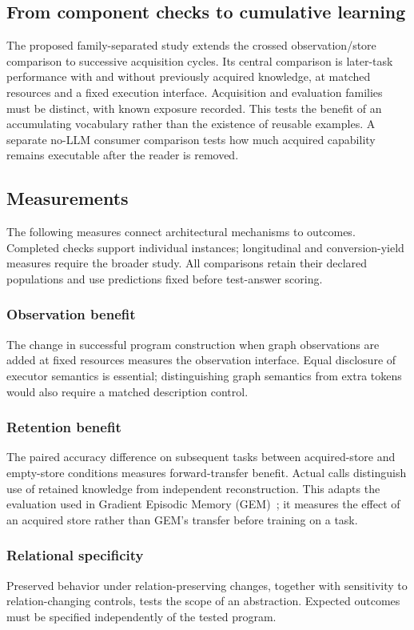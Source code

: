 \documentclass[11pt]{article}
\begin{document}
\subsection{From component checks to cumulative learning}\label{design:four-condition}
The proposed family-separated study extends the crossed observation/store comparison to successive acquisition cycles. Its central comparison is later-task performance with and without previously acquired knowledge, at matched resources and a fixed execution interface. Acquisition and evaluation families must be distinct, with known exposure recorded. This tests the benefit of an accumulating vocabulary rather than the existence of reusable examples. A separate no-LLM consumer comparison tests how much acquired capability remains executable after the reader is removed.

\subsection{Measurements}
The following measures connect architectural mechanisms to outcomes. Completed checks support individual instances; longitudinal and conversion-yield measures require the broader study. All comparisons retain their declared populations and use predictions fixed before test-answer scoring.

\subsubsection{Observation benefit}\label{measure:obs}
The change in successful program construction when graph observations are added at fixed resources measures the observation interface. Equal disclosure of executor semantics is essential; distinguishing graph semantics from extra tokens would also require a matched description control.

\subsubsection{Retention benefit}\label{measure:ret}
The paired accuracy difference on subsequent tasks between acquired-store and empty-store conditions measures forward-transfer benefit. Actual calls distinguish use of retained knowledge from independent reconstruction. This adapts the evaluation used in Gradient Episodic Memory (GEM)~\cite{gem}; it measures the effect of an acquired store rather than GEM's transfer before training on a task.

\subsubsection{Relational specificity}\label{measure:rel}
Preserved behavior under relation-preserving changes, together with sensitivity to relation-changing controls, tests the scope of an abstraction. Expected outcomes must be specified independently of the tested program.
\end{document}
